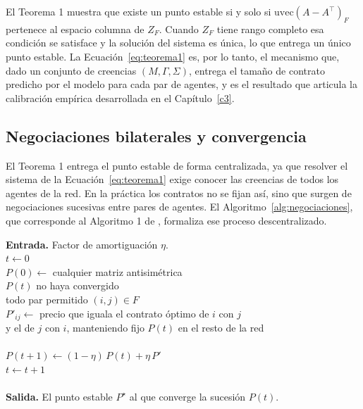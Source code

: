 El Teorema 1 muestra que existe un punto estable si y solo si $\mathrm{uvec}(A-A^\top)_F$ pertenece al espacio columna de $Z_F$. Cuando $Z_F$ tiene rango completo esa condición se satisface y la solución del sistema es única, lo que entrega un único punto estable. La Ecuación~\eqref{eq:teorema1} es, por lo tanto, el mecanismo que, dado un conjunto de creencias $(M,\Gamma,\Sigma)$, entrega el tamaño de contrato predicho por el modelo para cada par de agentes, y es el resultado que articula la calibración empírica desarrollada en el Capítulo~\ref{c3}.

\subsection{Negociaciones bilaterales y convergencia}
\label{c24:algoritmo1}

El Teorema 1 entrega el punto estable de forma centralizada, ya que resolver el sistema de la Ecuación~\eqref{eq:teorema1} exige conocer las creencias de todos los agentes de la red. En la práctica los contratos no se fijan así, sino que surgen de negociaciones sucesivas entre pares de agentes. El Algoritmo~\ref{alg:negociaciones}, que corresponde al Algoritmo 1 de , formaliza ese proceso descentralizado.

\begin{algorithm}
\label{alg:negociaciones}
\normalfont
\textbf{Entrada.} Factor de amortiguación $\eta$. \\
$t \leftarrow 0$ \\
$P(0) \leftarrow$ cualquier matriz antisimétrica \\
\bfWHILE $P(t)$ no haya convergido \bfDO \\
\tab \bfFOR todo par permitido $(i,j) \in F$ \bfDO \\
\tab \tab $P'_{ij} \leftarrow$ precio que iguala el contrato óptimo de $i$ con $j$ \\
\tab \tab \hspace*{1.6em} y el de $j$ con $i$, manteniendo fijo $P(t)$ en el resto de la red \\
\tab \bfEND \bfFOR \\
\tab $P(t+1) \leftarrow (1-\eta)\,P(t) + \eta\,P'$ \\
\tab $t \leftarrow t+1$ \\
\bfEND \bfWHILE \\
\textbf{Salida.} El punto estable $P^\star$ al que converge la sucesión $P(t)$.
\end{algorithm}

